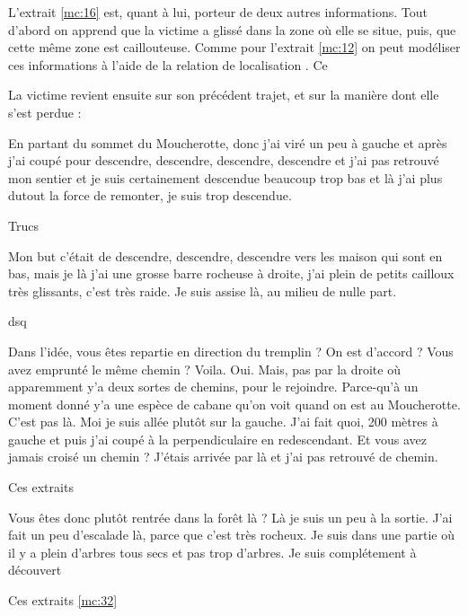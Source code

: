 L'extrait \ref{mc:16} est, quant à lui, porteur de deux autres
informations. Tout d'abord on apprend que la victime a glissé dans la
zone où elle se situe, puis, que cette même zone est
caillouteuse.
%
Comme pour l'extrait \ref{mc:12} on peut modéliser ces
informations à l'aide de la relation de localisation
. Ce 


La victime revient ensuite sur son précédent trajet, et sur la manière
dont elle s'est perdue :
%
\begin{dialogue}
  \Req {} En partant du sommet du Moucherotte, donc j’ai
  viré un peu à gauche et  après j'ai coupé pour
   descendre, descendre, descendre, descendre et
   j’ai pas retrouvé mon sentier et 
  je suis certainement descendue beaucoup trop bas et là
   j’ai plus dutout la force de remonter, je suis trop
  descendue.
\end{dialogue}
% 
Trucs

\begin{dialogue}
  \Req {} Mon but c’était de descendre, descendre,
  descendre vers les maison qui sont en bas,  mais je
  là j’ai une grosse barre rocheuse à droite,  j’ai
  plein de petits cailloux très glissants,  c’est très
  raide.  Je suis assise là, au milieu de nulle part.
\end{dialogue}
% 
dsq

\begin{dialogue}
  \Sec {} Dans l’idée, vous êtes repartie en direction
  du tremplin ? On est d’accord ? Vous avez emprunté le même chemin ?
  \Req {} Voila. Oui.  Mais, pas par la
  droite où  apparemment y’a deux sortes de chemins,
  pour le rejoindre.  Parce-qu’à un moment donné y’a
  une espèce de cabane qu’on voit quand on est au Moucherotte. C’est
  pas là.  Moi je suis allée plutôt sur la
  gauche. J’ai fait quoi, 200 mètres à gauche et  puis
  j’ai coupé à la perpendiculaire en redescendant.
  \Sec {} Et vous avez jamais croisé un chemin ?
  \Req {} J’étais arrivée par là et j’ai pas retrouvé de
  chemin.
\end{dialogue}
% 
Ces extraits

\begin{dialogue}
  \Sec {} Vous êtes donc plutôt rentrée dans la forêt là ?
  \Req {} Là je suis un peu à la
  sortie.  J’ai fait un peu d’escalade là,
   parce que c’est très rocheux.  Je
  suis dans une partie où il y a plein d’arbres tous secs et pas trop
  d’arbres. Je suis complétement à découvert
\end{dialogue}
% 
Ces extraits \ref{mc:32}


